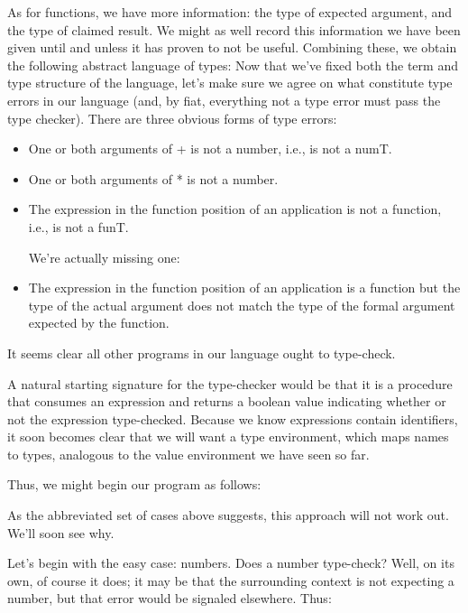 As for functions, we have more information: the type of expected argument, and
the type of claimed result. We might as well record this information we have
been given until and unless it has proven to not be useful. Combining these, we
obtain the following abstract language of types:
Now that we’ve fixed both the term and type structure of the language, let’s
make sure we agree on what constitute type errors in our language (and, by fiat,
everything not a type error must pass the type checker). There are three obvious
forms of type errors:
\begin{itemize}[nosep]
  \item 
One or both arguments of + is not a number, i.e., is not a numT.
  \item 
One or both arguments of * is not a number.
  \item 
The expression in the function position of an application is not a function,
i.e., is not a funT.


We’re actually missing one:

  \item 
The expression in the function position of an application is a function but the
type of the actual argument does not match the type of the formal argument
expected by the function.
\end{itemize}
It seems clear all other programs in our language ought to type-check.

A natural starting signature for the type-checker would be that it is a
procedure that consumes an expression and returns a boolean value indicating
whether or not the expression type-checked. Because we know expressions contain
identifiers, it soon becomes clear that we will want a type environment, which
maps names to types, analogous to the value environment we have seen so far.


Thus, we might begin our program as follows:

As the abbreviated set of cases above suggests, this approach will not work out.
We’ll soon see why.

Let’s begin with the easy case: numbers. Does a number type-check? Well, on its
own, of course it does; it may be that the surrounding context is not expecting
a number, but that error would be signaled elsewhere. Thus:

